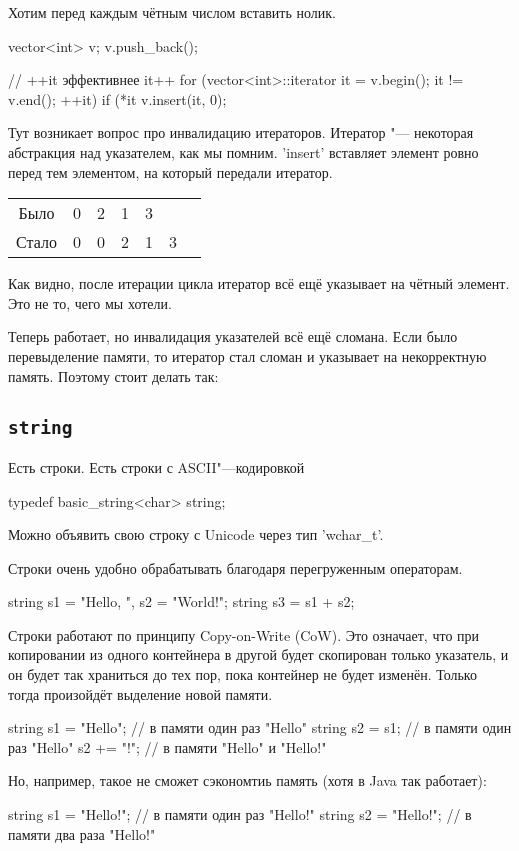 
Хотим перед каждым чётным числом вставить нолик.
\begin{cppcode}
vector<int> v;
v.push_back();

// ++it эффективнее it++
for (vector<int>::iterator it = v.begin(); it != v.end(); ++it) {
	if (*it %
		v.insert(it, 0);
}
\end{cppcode}
Тут возникает вопрос про инвалидацию итераторов.
Итератор "--- некоторая абстракция над указателем, как мы помним.
\cpp'insert' вставляет элемент ровно перед тем элементом, на который передали итератор.
\begin{center}
\begin{tabular}{c|cccccc}
Было  & 0 & 2 & 1 & 3 & \\
Стало & 0 & 0 & 2 & 1 & 3
\end{tabular}
\end{center}
Как видно, после итерации цикла итератор всё ещё указывает на чётный элемент. Это не то, чего мы хотели.
Теперь работает, но инвалидация указателей всё ещё сломана.
Если было перевыделение памяти, то итератор стал сломан и указывает на некорректную память. Поэтому стоит делать так:

\subsection{\texttt{string}}

Есть строки. Есть строки с ASCII"---кодировкой
\begin{cppcode}
typedef basic_string<char> string;
\end{cppcode}
Можно объявить свою строку с Unicode через тип \cpp'wchar_t'.

Строки очень удобно обрабатывать благодаря перегруженным операторам.
\begin{cppcode}
string s1 = "Hello, ", s2 = "World!";
string s3 = s1 + s2;
\end{cppcode}

Строки работают по принципу Copy-on-Write (CoW).
Это означает, что при копировании из одного контейнера в другой будет скопирован только указатель,
и он будет так храниться до тех пор, пока контейнер не будет изменён.
Только тогда произойдёт выделение новой памяти.
\begin{cppcode}
string s1 = "Hello"; // в памяти один раз "Hello"
string s2 = s1; // в памяти один раз "Hello"
s2 += "!"; // в памяти "Hello" и "Hello!"
\end{cppcode}
Но, например, такое не сможет сэкономтиь память (хотя в Java так работает):
\begin{cppcode}
string s1 = "Hello!"; // в памяти один раз "Hello!"
string s2 = "Hello!"; // в памяти два раза "Hello!"
\end{cppcode}


